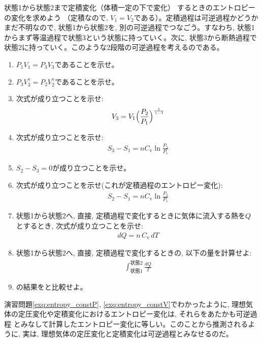 \begin{exq}\label{exq:entropy_constV} 状態1から状態2まで定積変化（体積一定の下で変化）
するときのエントロピーの変化を求めよう
（定積なので, $V_1=V_2$である）。定積過程は可逆過程かどうかまだ不明なので, 状態1から状態2を, 
別の可逆過程でつなごう。すなわち, 状態1からまず等温過程で状態3という状態に持っていく。次に, 
状態3から断熱過程で状態2に持っていく。このような2段階の可逆過程を考えるのである。
\begin{enumerate}
\item $P_1V_1=P_3V_3$であることを示せ。
\item $P_3V_3^{\gamma}=P_2V_2^{\gamma}$であることを示せ。
\item 次式が成り立つことを示せ:
\begin{eqnarray}
V_3=V_1\Bigl(\frac{P_2}{P_1}\Bigr)^{\frac{1}{\gamma-1}}
\end{eqnarray}
\item 次式が成り立つことを示せ:
\begin{eqnarray}
S_3-S_1=nC_{\text{v}}\ln \frac{P_2}{P_1}
\end{eqnarray}
\item $S_2-S_3=0$が成り立つことを示せ。
\item 次式が成り立つことを示せ(これが定積過程のエントロピー変化):
\begin{eqnarray}
S_2-S_1=nC_{\text{v}}\ln \frac{P_2}{P_1}\label{eq:entropy_constV6}
\end{eqnarray}
\item 状態1から状態2へ, 直接, 定積過程で変化するときに気体に流入する熱を$Q$
とするとき, 次式が成り立つことを示せ:
\begin{eqnarray}
dQ=n\,C_{\text{v}}\,dT
\end{eqnarray}
\item 状態1から状態2へ, 直接, 定積過程で変化するときの, 以下の量を計算せよ:
\begin{eqnarray}
\int_{\text{状態1}}^{\text{状態2}} \frac{dQ}{T}\label{eq:entropy_constV8}
\end{eqnarray}
\item {}の結果をと比較せよ。
\end{enumerate}
\end{exq}

演習問題\ref{exq:entropy_constP}, \ref{exq:entropy_constV}でわかったように, 
理想気体の定圧変化や定積変化におけるエントロピー変化は, それらをあたかも可逆過程
とみなして計算したエントロピー変化に等しい。このことから推測されるように, 実は, 
理想気体の定圧変化と定積変化は可逆過程とみなせるのだ。\\

